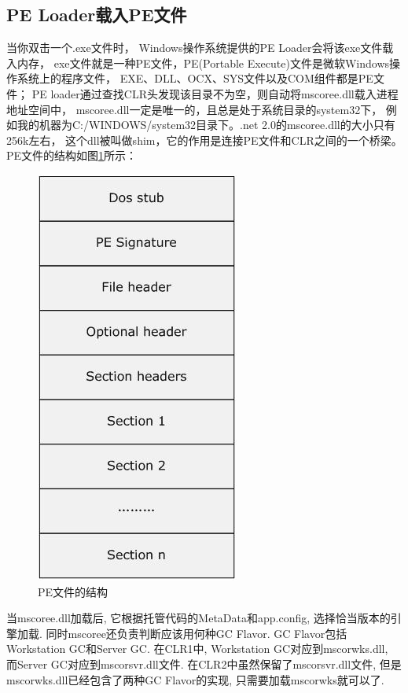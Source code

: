 \documentclass{book}
\begin{document}
\subsection{PE Loader载入PE文件}当你双击一个.exe文件时，
Windows操作系统提供的PE Loader会将该exe文件载入内存，
exe文件就是一种PE文件，PE(Portable Execute)文件是微软Windows操作系统上的程序文件，
EXE、DLL、OCX、SYS文件以及COM组件都是PE文件；
PE loader通过查找CLR头发现该目录不为空，则自动将mscoree.dll载入进程地址空间中，
mscoree.dll一定是唯一的，且总是处于系统目录的system32下，
例如我的机器为C:/WINDOWS/system32目录下。.net 2.0的mscoree.dll的大小只有256k左右，
这个dll被叫做shim，它的作用是连接PE文件和CLR之间的一个桥梁。
PE文件的结构如图\ref{fig:PEFileStructure}所示：

\begin{figure}[htbp]
	\centering
	\includegraphics[scale=0.6]{PEFileStructure.jpg}
	\caption{PE文件的结构}
	\label{fig:PEFileStructure}
\end{figure}

当mscoree.dll加载后, 它根据托管代码的MetaData和app.config,
选择恰当版本的引擎加载. 同时mscoree还负责判断应该用何种GC Flavor. 
GC Flavor包括Workstation GC和Server GC. 
在CLR1中, Workstation GC对应到mscorwks.dll, 
而Server GC对应到mscorsvr.dll文件. 在CLR2中虽然保留了mscorsvr.dll文件, 
但是mscorwks.dll已经包含了两种GC Flavor的实现, 只需要加载mscorwks就可以了.
 
\end{document}
